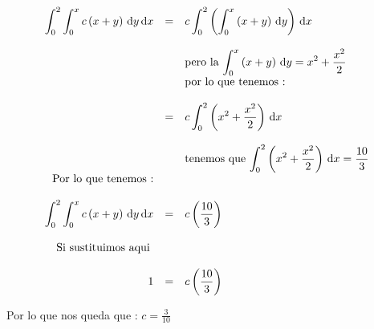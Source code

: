 \documentclass[12pt]{article}
\begin{document}
    \begin{equation*}
        \begin{array}{rcl}
            \displaystyle \int_{0}^{2} \int_{0}^{x} c\left(x+y \right) \,\mathrm{d}y \,\mathrm{d}x  & = & \displaystyle c  \int_{0}^{2} \left( \int_{0}^{x} \left(x+y \right) \,\mathrm{d}y \right)\,\mathrm{d}x 
            \\
            \\
            && \mbox{pero la $ \displaystyle  \int_{0}^{x} \left(x+y \right) \,\mathrm{d}y = x^2 + \frac{x^2}{2} $}
            \\
            && \mbox{por lo que tenemos : }
            \\
            \\
            & = &  \displaystyle c  \int_{0}^{2} \left(x^2 + \frac{x^2}{2}\right)\,\mathrm{d}x 
            \\
            \\
            && \mbox{tenemos que $ \displaystyle \int_{0}^{2} \left(x^2 + \frac{x^2}{2}\right)\,\mathrm{d}x  = \frac{10}{3}$ }
            \\
            \mbox{Por lo que tenemos  :}&&
            \\
            \\
            \displaystyle \int_{0}^{2} \int_{0}^{x} c\left(x+y \right) \,\mathrm{d}y \,\mathrm{d}x  & = & \displaystyle c \left(\frac{10}{3}\right)
            \\
            \\
            \mbox{Si sustituimos aqui }&&
            \\
            \\
            1 & = & \displaystyle c \left(\frac{10}{3}\right)
        \end{array}
    \end{equation*}

    \begin{flushleft}
        Por lo que nos queda que : $ \displaystyle c = \frac{3}{10}$
    \end{flushleft}
\end{document}
